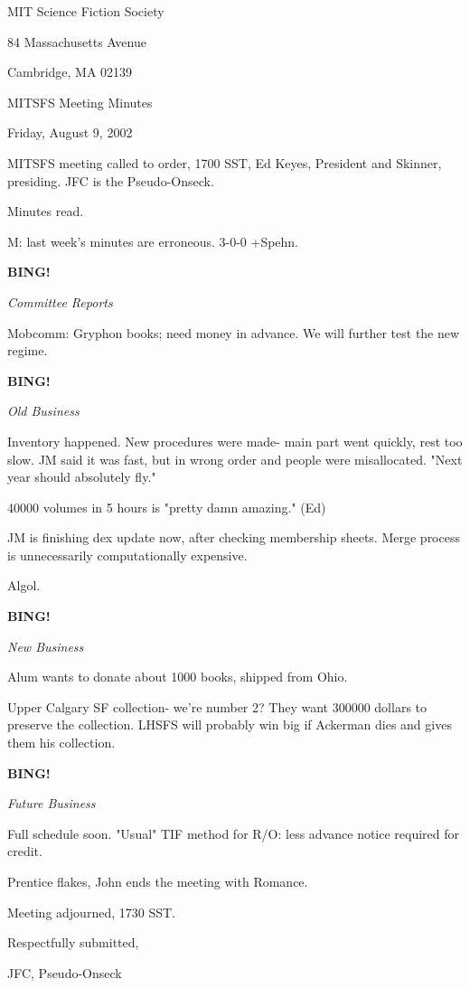 \documentclass[12pt]{article}
\newcommand{\bing}{{\bf BING!} }
\newcommand{\goto}[1]{\bing \vskip 12pt \centerline{{\em{#1}}}}
\begin{document}
\begin{center}

MIT Science Fiction Society 

84 Massachusetts Avenue

Cambridge, MA 02139

\vspace{12pt}

MITSFS Meeting Minutes 

Friday, August 9, 2002

\end{center}
 
\vspace{18pt}

\setlength{\parskip}{6pt}

\noindent
MITSFS meeting called to order, 1700 SST, Ed Keyes, President and Skinner, presiding. JFC is the Pseudo-Onseck.

Minutes read.

M: last week's minutes are erroneous. 3-0-0 +Spehn.

\goto{Committee Reports}

Mobcomm: Gryphon books; need money in advance. We will further test the new regime.

\goto{Old Business}

Inventory happened. New procedures were made- main part went quickly, rest too slow. JM said it was fast, but in wrong order and people were misallocated. "Next year should absolutely fly."

40000 volumes in 5 hours is "pretty damn amazing." (Ed)

JM is finishing dex update now, after checking membership sheets. Merge process is unnecessarily computationally expensive.

Algol.

\goto{New Business}

Alum wants to donate about 1000 books, shipped from Ohio.

Upper Calgary SF collection- we're number 2? They want 300000 dollars to preserve the collection. LHSFS will probably win big if Ackerman dies and gives them his collection.

\goto{Future Business}

Full schedule soon. "Usual" TIF method for R/O: less advance notice required for credit.

Prentice flakes, John ends the meeting with Romance.

\vspace{12pt}

\noindent
Meeting adjourned, 1730 SST.

\vspace{18pt}

\centerline{Respectfully submitted,}
\centerline{JFC, Pseudo-Onseck}
\end{document}
